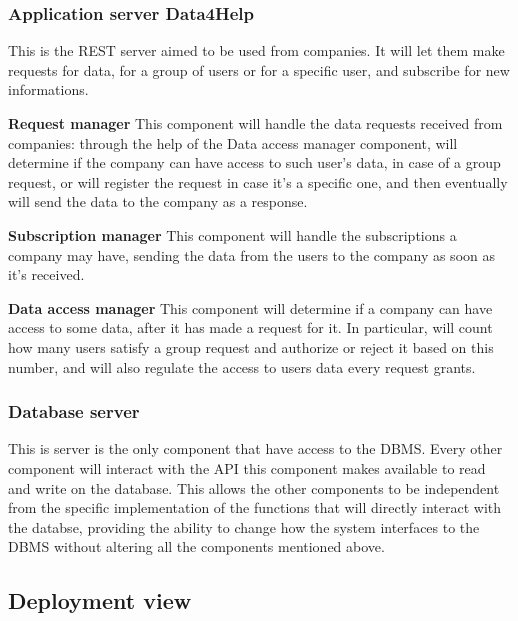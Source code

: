 \documentclass[../main.tex]{subfiles}
\begin{document}
\subsubsection{Application server Data4Help} This is the REST server aimed to be used from companies. It will let them make requests for data, for a group of users or for a specific user, and subscribe for new informations.

\begin{description}

	\item{\bf Request manager} This component will handle the data requests received from companies: through the help of the Data access manager component, will determine if the company can have access to such user's data, in case of a group request, or will register the request in case it's a specific one, and then eventually will send the data to the company as a response.

	\item{\bf Subscription manager} This component will handle the subscriptions a company may have, sending the data from the users to the company as soon as it's received.

	\item{\bf Data access manager} This component will determine if a company can have access to some data, after it has made a request for it. In particular, will count how many users satisfy a group request and authorize or reject it based on this number, and will also regulate the access to users data every request grants.

\end{description}

\subsubsection{Database server} This is server is the only component that have access to the DBMS. Every other component will interact with the API this component makes available to read and write on the database. This allows the other components to be independent from the specific implementation of the functions that will directly interact with the databse, providing the ability to change how the system interfaces to the DBMS without altering all the components mentioned above.

\subsection{Deployment view}
\end{document}
